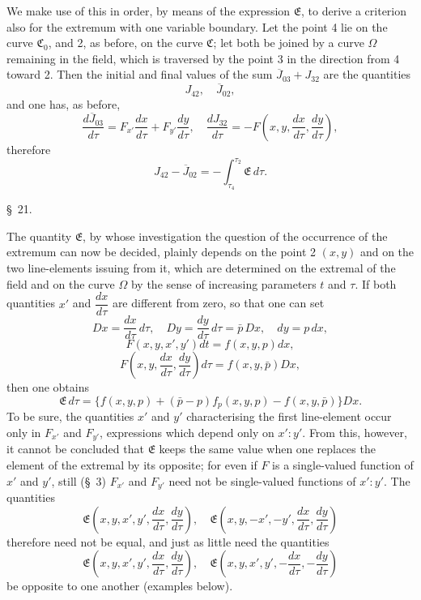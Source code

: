 \documentclass[11pt,a4paper,leqno]{article}
\begin{document}
 We make use of this in order, by means of the expression $\mathfrak{E}$, to derive a criterion also for the extremum with one variable boundary. Let the point 4 lie on the curve $\mathfrak{C}_0$, and 2, as before, on the curve $\mathfrak{C}$; let both be joined by a curve $\Omega$ remaining in the field, which is traversed by the point 3 in the direction from 4 toward 2. Then the initial and final values of the sum $\overline{J}_{03}+J_{32}$ are the quantities
\[
J_{42},\quad \overline{J}_{02},
\]
and one has, as before,
\[
\frac{d\overline{J}_{03}}{d\tau}
=
F_{x'}\frac{dx}{d\tau}
+F_{y'}\frac{dy}{d\tau},
\quad
\frac{dJ_{32}}{d\tau}
=
-F\left(x,y,\frac{dx}{d\tau},\frac{dy}{d\tau}\right),
\]
therefore
\begin{equation}\tag{57}
J_{42}-\overline{J}_{02}
=
-\int_{\tau_4}^{\tau_2}\mathfrak{E}\,d\tau.
\end{equation}





\begin{center}{\large \S~21.}\end{center}

The quantity $\mathfrak{E}$, by whose investigation the question of the occurrence of the extremum can now be decided, plainly depends on the point 2 $(x,y)$ and on the two line-elements issuing from it, which are determined on the extremal of the field and on the curve $\Omega$ by the sense of increasing parameters $t$ and $\tau$. If both quantities $x'$ and $\dfrac{dx}{d\tau}$ are different from zero, so that one can set
\[
D x=\frac{dx}{d\tau}\,d\tau,\quad
D y=\frac{dy}{d\tau}\,d\tau=\bar{p}\,D x,\quad
dy=p\,dx,
\]
\[
F(x,y,x',y')dt=f(x,y,p)dx,
\]
\[
F\left(x,y,\frac{dx}{d\tau},\frac{dy}{d\tau}\right)d\tau
=
f(x,y,\bar{p})D x,
\]
then one obtains
\begin{equation}\tag{58}
\mathfrak{E}\,d\tau
=
\{f(x,y,p)+(\bar{p}-p)f_p(x,y,p)-f(x,y,\bar{p})\}D x.
\end{equation}
To be sure, the quantities $x'$ and $y'$ characterising the first line-element occur only in $F_{x'}$ and $F_{y'}$, expressions which depend only on $x':y'$. From this, however, it cannot be concluded that $\mathfrak{E}$ keeps the same value when one replaces the element of the extremal by its opposite; for even if $F$ is a single-valued function of $x'$ and $y'$, still (\S~3) $F_{x'}$ and $F_{y'}$ need not be single-valued functions of $x':y'$. The quantities
\[
\mathfrak{E}\left(x,y,x',y',\frac{dx}{d\tau},\frac{dy}{d\tau}\right),\quad
\mathfrak{E}\left(x,y,-x',-y',\frac{dx}{d\tau},\frac{dy}{d\tau}\right)
\]
therefore need not be equal, and just as little need the quantities
\[
\mathfrak{E}\left(x,y,x',y',\frac{dx}{d\tau},\frac{dy}{d\tau}\right),\quad
\mathfrak{E}\left(x,y,x',y',-\frac{dx}{d\tau},-\frac{dy}{d\tau}\right)
\]
be opposite to one another (examples below).
\end{document}
